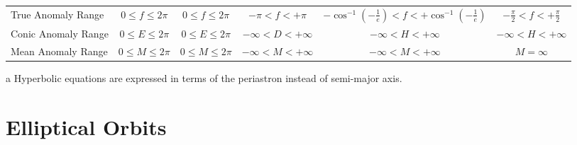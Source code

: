 \documentclass[a4paper,fleqn,usenatbib]{mnras}
\begin{document}
\begin{table}
\begin{threeparttable}
\begin{tabular}{ l c c c c c }
 True Anomaly Range & $0\leq f \leq 2\pi$ & $0\leq f \leq 2\pi$ & $-\pi< f < +\pi$ & $-\cos^{-1}{(-\frac{1}{e})} < f < +\cos^{-1}{(-\frac{1}{e})}$ & $-\frac{\pi}{2} < f < +\frac{\pi}{2}$ \\

 Conic Anomaly Range & $0\leq E \leq 2\pi$ & $0\leq E \leq 2\pi$ & $-\infty < D < +\infty$ & $-\infty< H < +\infty$ & $-\infty< H < +\infty$ \\
 
 Mean Anomaly Range & $0\leq M \leq 2\pi$ & $0\leq M \leq 2\pi$ & $-\infty< M < +\infty$ & $-\infty < M < +\infty$ & $M=\infty$ \\
 
 \hline
 \hline
\end{tabular}
\label{tab:summary}
	\begin{tablenotes}
	\small
\item[a]{Hyperbolic equations are expressed in terms of the periastron instead of semi-major axis.}
	\end{tablenotes}
\end{threeparttable}
\end{table}


\section{Elliptical Orbits} \label{sec:elliptical}
\end{document}
